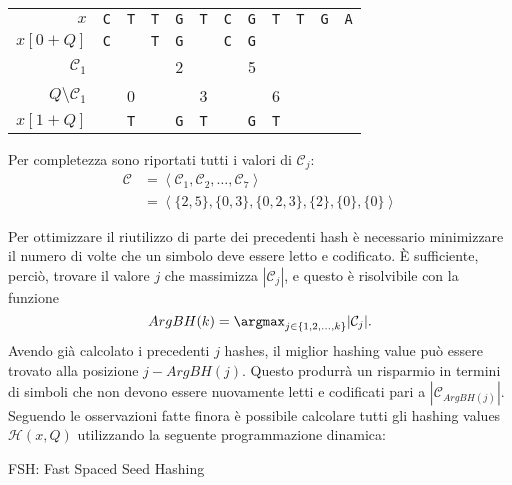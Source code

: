 \begin{example}
	{
		\centering
		\begin{tabular}{r | ccccccccccc}
			$x$ & \texttt{C} & \texttt{T} & \texttt{T} & \texttt{G} & \texttt{T} & \texttt{C} & \texttt{G} & \texttt{T} & \texttt{T} & \texttt{G} & \texttt{A} \\
			$x[0 + Q]$ & \texttt{C} & & \texttt{T} & \texttt{G} & & \texttt{C} & \texttt{G} \\
			$\mathcal{C}_1$ & & & & 2 & & & 5 & \\
			$Q \setminus \mathcal{C}_1$ & & 0 & & & 3 & & & 6 \\
			$x[1 + Q]$ & & \texttt{T} & & \texttt{G} & \texttt{T} & & \texttt{G} & \texttt{T} \\
		\end{tabular}
		
	}
	
	Per completezza sono riportati tutti i valori di $\mathcal{C}_j$: \begin{align*}
		\mathcal{C} &= \left\langle \mathcal{C}_1, \mathcal{C}_2, \dots, \mathcal{C}_7 \right\rangle \\
		&= \left\langle \{2, 5\}, \{0, 3\}, \{0, 2, 3\}, \{2\}, \{0\}, \{0\} \right\rangle
	\end{align*}
\end{example}

Per ottimizzare il riutilizzo di parte dei precedenti hash è necessario minimizzare il numero di volte che un simbolo deve essere letto e codificato. È sufficiente, perciò, trovare il valore $j$ che massimizza $|\mathcal{C}_j|$, e questo è risolvibile con la funzione \[ ArgBH(k) = \argmax_{j \in \{ 1, 2, \dots, k \}} |\mathcal{C}_j|. \] Avendo già calcolato i precedenti $j$ hashes, il miglior hashing value può essere trovato alla posizione $j - ArgBH(j)$. Questo produrrà un risparmio in termini di simboli che non devono essere nuovamente letti e codificati pari a $|\mathcal{C}_{ArgBH(j)}|$. Seguendo le osservazioni fatte finora è possibile calcolare tutti gli hashing values $\mathcal{H}(x, Q)$ utilizzando la seguente programmazione dinamica:

\begin{algorithm}[H]
	\caption{FSH: Fast Spaced Seed Hashing}
	\label{alg:FSH}
\end{algorithm}

